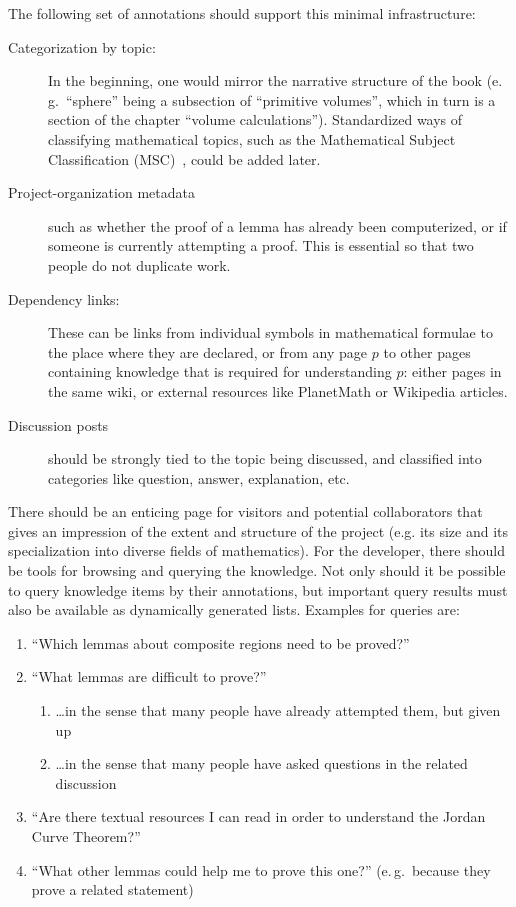 The following set of annotations should support this minimal infrastructure:

\begin{description}
\item[Categorization by topic:] In the beginning, one would mirror the narrative structure
  of the book (e.\,g.\ ``sphere'' being a subsection of ``primitive volumes'', which in turn
  is a section of the chapter ``volume calculations'').  Standardized ways of classifying
  mathematical topics, such as the Mathematical Subject Classification
  (MSC)~\cite{AMS:MSC2000}, could be added later.
\item[Project-organization metadata] such as whether the proof
  of a lemma has already been computerized, or if someone is currently 
  attempting a proof.  This is essential so that two people do not duplicate
  work.
\item[Dependency links:] These can be links from individual symbols in
  mathematical formulae to the place where they are declared, or from
  any page $p$ to other pages containing knowledge that is required
  for understanding $p$: either pages in the same wiki, or external
  resources like PlanetMath or Wikipedia articles.
\item[Discussion posts] should be strongly tied to the topic being
  discussed, and classified into categories like question, answer,
  explanation, etc.
\end{description}

There should be an enticing page for visitors and potential
collaborators that gives an impression of the extent and structure of
the project (e.g. its size and its specialization into diverse fields
of mathematics).  For the developer, there should be tools for
browsing and querying the knowledge.  Not only should it be possible
to query knowledge items by their annotations, but important query
results must also be available as dynamically generated lists.
Examples for queries are:

\begin{enumerate}
\item\label{item:proven-lemma} ``Which lemmas about composite regions need
  to be proved?''
\item ``What lemmas are difficult to prove?''
  \begin{enumerate}
  \item \ldots in the sense that many people have already attempted them, but given up
  \item\label{item:question-count} \ldots in the sense that many people have asked
    questions in the related discussion
  \end{enumerate}
\item ``Are there textual resources I can read in order to understand the Jordan
  Curve Theorem?''
\item ``What other lemmas could help me to prove this one?'' (e.\,g.\ because
  they prove a related statement)
\end{enumerate}

